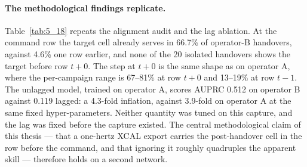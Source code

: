 \paragraph{The methodological findings replicate.} Table~\ref{tab:5_18} repeats the alignment audit and the lag ablation. At the command row the target cell already serves in 66.7\% of operator-B handovers, against 4.6\% one row earlier, and none of the 20 isolated handovers shows the target before row $t+0$. The step at $t+0$ is the same shape as on operator A, where the per-campaign range is 67--81\% at row $t+0$ and 13--19\% at row $t-1$. The unlagged model, trained on operator A, scores AUPRC 0.512 on operator B against 0.119 lagged: a 4.3-fold inflation, against 3.9-fold on operator A at the same fixed hyper-parameters. Neither quantity was tuned on this capture, and the lag was fixed before the capture existed. The central methodological claim of this thesis --- that a one-hertz XCAL export carries the post-handover cell in the row before the command, and that ignoring it roughly quadruples the apparent skill --- therefore holds on a second network.

\begin{table}[htbp]
\centering
\caption{Confirmatory checks on the blind capture. Top: share of handovers whose target cell already serves in the export row at each offset. Bottom: fixed-parameter LightGBM trained on operator A, scored on operator B.}
\label{tab:5_18}
\vspace{0.4em}
\singlespacing
\footnotesize
{}
\end{table}

